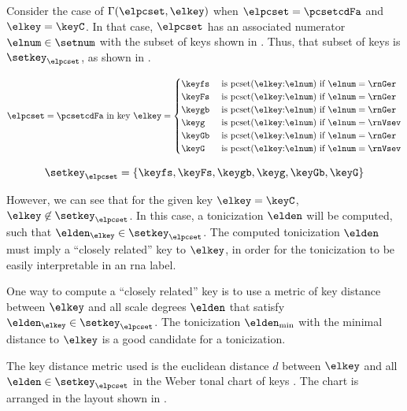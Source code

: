 
Consider the case of $\Gamma(\elpcset, \elkey)$ when
$\elpcset = \pcsetcdFa$ and $\elkey = \keyC$. In that case,
$\elpcset$ has an associated numerator $\elnum \in \setnum$
with the subset of keys shown in .
Thus, that subset of keys is $\setkey_\elpcset$, as shown in
. 

\begin{equation}
    \label{eq:key_not_found}
    \elpcset = \pcsetcdFa \text{ in key } \elkey =
    \begin{cases}
        \keyfs & \text{ is pcset}(\elkey\text{:}\elnum)\text{ if } \elnum = \rnGer \\
        \keyFs & \text{ is pcset}(\elkey\text{:}\elnum)\text{ if } \elnum = \rnGer \\
        \keygb & \text{ is pcset}(\elkey\text{:}\elnum)\text{ if } \elnum = \rnGer \\
        \keyg  & \text{ is pcset}(\elkey\text{:}\elnum)\text{ if } \elnum = \rnVsev \\
        \keyGb & \text{ is pcset}(\elkey\text{:}\elnum)\text{ if } \elnum = \rnGer \\
        \keyG  & \text{ is pcset}(\elkey\text{:}\elnum)\text{ if } \elnum = \rnVsev \\
    \end{cases}
\end{equation}

\begin{equation}
    \label{eq:key_not_found2}
    \setkey_\elpcset = \{ \keyfs, \keyFs, \keygb, \keyg, \keyGb, \keyG \}
\end{equation}

However, we can see that for the given key $\elkey = \keyC$,
$\elkey \not\in \setkey_\elpcset$. In this case, a
tonicization $\elden$ will be computed, such that
$\elden_\elkey \in \setkey_\elpcset$. The computed
tonicization $\elden$ must imply a ``closely related'' key
to $\elkey$, in order for the tonicization to be easily
interpretable in an \gls{rna} label.

One way to compute a ``closely related'' key is to use a
metric of key distance between $\elkey$ and all scale
degrees $\elden$ that satisfy $\elden_\elkey \in
\setkey_\elpcset$. The tonicization $\elden_{\min}$ with the
minimal distance to $\elkey$ is a good candidate for a
tonicization.

The key distance metric used is the euclidean distance $d$
between $\elkey$ and all $\elden \in \setkey_\elpcset$ in
the Weber tonal chart of keys \parencite{weber1818versuch}.
The chart is arranged in the layout shown in
.


